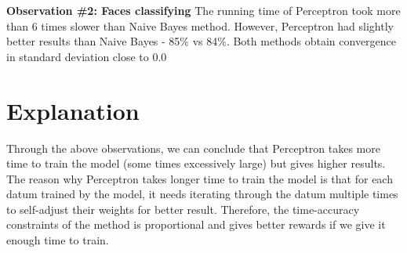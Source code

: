\documentclass{article}
\begin{document}
\textbf{Observation \#2: Faces classifying}
The running time of Perceptron took more than 6 times slower than Naive Bayes method. However, Perceptron had slightly better results than Naive Bayes - 85\% vs 84\%. Both methods obtain convergence in standard deviation close to 0.0

\section{Explanation}
Through the above observations, we can conclude that Perceptron takes more time to train the model (some times excessively large) but gives higher results. The reason why Perceptron takes longer time to train the model is that for each datum trained by the model, it needs iterating through the datum multiple times to self-adjust their weights for better result. Therefore, the time-accuracy constraints of the method is proportional and gives better rewards if we give it enough time to train.
\end{document}
